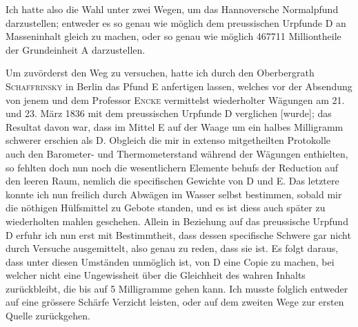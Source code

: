 \clearpage\begingroup{}
Ich hatte also die Wahl unter zwei Wegen, um das Hannoversche Normalpfund
darzustellen; entweder es so genau wie möglich dem preussischen Urpfunde
D an Masseninhalt gleich zu machen, oder so genau wie möglich
467711 Milliontheile der Grundeinheit A darzustellen.

Um zuvörderst den  Weg zu versuchen, hatte ich durch den Oberbergrath
\textsc{Schaffrinsky} in Berlin das Pfund E anfertigen lassen, welches vor
der Absendung von jenem und dem Professor \textsc{Encke} vermittelst wiederholter
Wägungen am 21. und 23. März 1836 mit dem preussischen Urpfunde D verglichen
[wurde]; das Resultat davon war, dass im Mittel E auf der Waage um
ein halbes Milligramm schwerer erschien als D. Obgleich die mir in extenso
mitgetheilten Protokolle auch den Barometer- und Thermometerstand während
der Wägungen enthielten, so fehlten doch nun noch die wesentlichern Elemente
behufs der Reduction auf den leeren Raum, nemlich die specifischen
Gewichte von D und E. Das letztere konnte ich nun freilich durch Abwägen
im Wasser selbst bestimmen, sobald mir die nöthigen Hülfsmittel zu Gebote
standen, und es ist diess auch später zu wiederholten mahlen geschehen.
Allein in Beziehung auf das preussische Urpfund D erfuhr ich nun erst mit
Bestimmtheit, dass dessen specifische Schwere gar nicht durch Versuche ausgemittelt,
also genau zu reden, dass sie  ist. Es folgt daraus, dass
unter diesen Umständen unmöglich ist, von D eine Copie zu machen, bei
welcher nicht eine Ungewissheit über die Gleichheit des wahren Inhalts zurückbleibt,
die bis auf 5 Milligramme gehen kann. Ich musste folglich entweder
auf eine grössere Schärfe Verzicht leisten, oder auf dem zweiten Wege zur
ersten Quelle zurückgehen.

